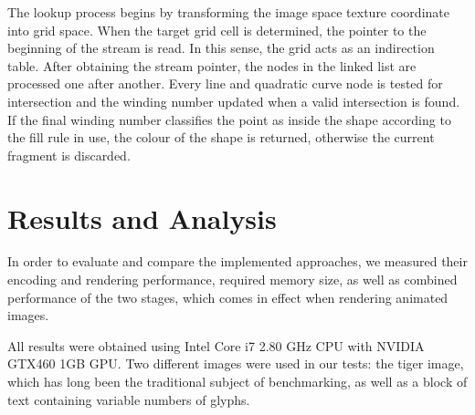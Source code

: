 \documentclass[11pt,a4paper,twoside]{article}
\begin{document}
The lookup process begins by transforming the image space texture coordinate into grid space. When the target grid cell is determined, the pointer to the beginning of the stream is read. In this sense, the grid acts as an indirection table. After obtaining the stream pointer, the nodes in the linked list are processed one after another. Every line and quadratic curve node is tested for intersection and the winding number updated when a valid intersection is found. If the final winding number classifies the point as inside the shape according to the fill rule in use, the colour of the shape is returned, otherwise the current fragment is discarded.


\section {Results and Analysis}

In order to evaluate and compare the implemented approaches, we measured their encoding and rendering performance, required memory size, as well as combined performance of the two stages, which comes in effect when rendering animated images.

All results were obtained using Intel Core i7 2.80 GHz CPU with NVIDIA GTX460 1GB GPU. Two different images were used in our tests: the tiger image, which has long been the traditional subject of benchmarking, as well as a block of text containing variable numbers of glyphs.
\end{document}
